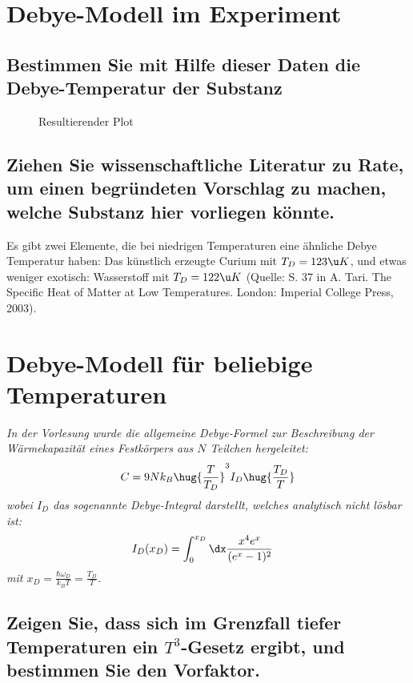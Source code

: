 \documentclass[exa]{exercise_5.0}
\begin{document}
\section{Debye-Modell im Experiment}
\subsection{Bestimmen Sie mit Hilfe dieser Daten die Debye-Temperatur der Substanz}

\dottedlinett


\begin{figure}[H]
    \centering
    
    \caption{Resultierender Plot}
\end{figure}

\subsection{Ziehen Sie wissenschaftliche Literatur zu Rate, um einen begründeten Vorschlag zu machen,
welche Substanz hier vorliegen könnte.}

\dottedlinett

Es gibt zwei Elemente, die bei niedrigen Temperaturen eine ähnliche Debye Temperatur haben: 
Das künstlich erzeugte Curium mit $T_D = 123\u K$, und etwas weniger exotisch: Wasserstoff mit $T_D = 122\u K $ (Quelle: S. 37 in A. Tari. The Specific Heat of Matter at Low Temperatures. London: Imperial College Press, 2003).

\section{Debye-Modell für beliebige Temperaturen}
{\it In der Vorlesung wurde die allgemeine Debye-Formel zur Beschreibung der Wärmekapazität eines Festkörpers aus \(N\) Teilchen hergeleitet:
\begin{align*}
    C = 9 N k_B \hug{\frac T{T_D}}^3 I_D\hug{\frac{T_D}T}
\end{align*}
wobei \(I_D\) das sogenannte Debye-Integral darstellt, welches analytisch nicht lösbar ist:
\begin{align*}
    I_D(x_D) &=\int_0^{x_D} \dx\frac{x^4 e^x}{(e^x - 1)^2}
\end{align*}
mit $x_D = \frac{\hbar \omega_D}{ k_B T} = \frac{T_D} T$.
}

\subsection{Zeigen Sie, dass sich im Grenzfall tiefer Temperaturen ein $T^3$-Gesetz ergibt, und bestimmen Sie den Vorfaktor.}
\end{document}
